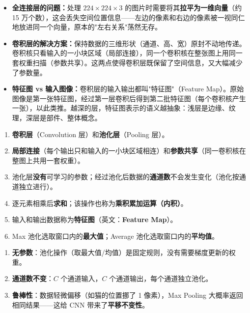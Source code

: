 \documentclass[a4paper,11pt]{ctexart}
\begin{document}
\begin{beginnerbox}
    \begin{itemize}
        \item \textbf{全连接层的问题：}处理 $224 \times 224 \times 3$ 的图片时需要将其\textbf{拉平为一维向量}（约 15 万个数），这会丢失空间位置信息——左边的像素和右边的像素被一视同仁地放进同一个向量，原本的"左右关系"荡然无存。
        \item \textbf{卷积层的解决方案：}保持数据的三维形状（通道、高、宽）原封不动地传递。卷积核只看输入的一小块区域（局部连接），同一个卷积核在整张图上用同一套权重扫描（参数共享）。这两点使得卷积层既保留了空间信息，又大幅减少了参数量。
        \item \textbf{特征图 vs 输入图像：}卷积层的输入输出都叫"特征图"（Feature Map）。原始图像是第一张特征图，经过第一层卷积后得到第二批特征图（每个卷积核产生一张），以此类推。越深的层，特征图表示的语义越抽象：浅层是边缘、纹理，深层是部件、整体概念。
    \end{itemize}
\end{beginnerbox}

\begin{solutionbox}[参考答案与详细解析]
    \begin{enumerate}[(1)]
        \item \textbf{卷积层}（Convolution 层）和\textbf{池化层}（Pooling 层）。
        \item \textbf{局部连接}（每个输出只和输入的一小块区域相连）和\textbf{参数共享}（同一卷积核在整图上共用一套权重）。
        \item 池化层\textbf{没有}可学习的参数；经过池化后数据的\textbf{通道数}不会发生变化（池化按通道独立进行）。
        \item 逐元素相乘后\textbf{求和}；该操作也称为\textbf{乘积累加运算（内积）}。
        \item 输入和输出数据称为\textbf{特征图}（英文：\textbf{Feature Map}）。
        \item Max 池化选取窗口内的\textbf{最大值}；Average 池化选取窗口内的\textbf{平均值}。
    \end{enumerate}

    \begin{keybox}
        \begin{enumerate}
            \item \textbf{无参数}：池化操作（取最大值/均值）是固定规则，没有需要梯度更新的权重。
            \item \textbf{通道数不变}：$C$ 个通道输入，$C$ 个通道输出，每个通道独立池化。
            \item \textbf{鲁棒性}：数据轻微偏移（如猫的位置挪了 1 像素），Max Pooling 大概率返回相同结果——这给 CNN 带来了\textbf{平移不变性}。
        \end{enumerate}
    \end{keybox}
\end{solutionbox}
\end{document}

